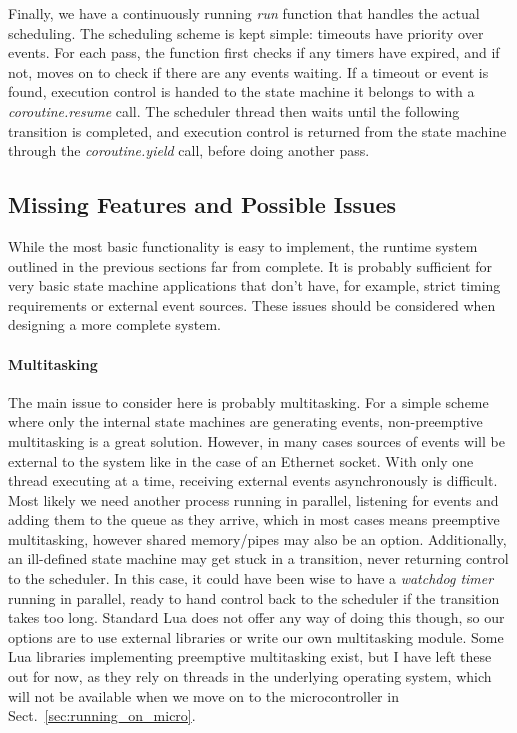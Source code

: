 Finally, we have a continuously running \emph{run} function that handles the actual scheduling. The scheduling scheme is kept simple: timeouts have priority over events. For each pass, the function first checks if any timers have expired, and if not, moves on to check if there are any events waiting. If a timeout or event is found, execution control is handed to the state machine it belongs to with a \emph{coroutine.resume} call. The scheduler thread then waits until the following transition is completed, and execution control is returned from the state machine through the \emph{coroutine.yield} call, before doing another pass.

\subsection{Missing Features and Possible Issues}
While the most basic functionality is easy to implement, the runtime system outlined in the previous sections far from complete. It is probably sufficient for very basic state machine applications that don't have, for example, strict timing requirements or external event sources. These issues should be considered when designing a more complete system.

\paragraph{Multitasking} The main issue to consider here is probably multitasking. For a simple scheme where only the internal state machines are generating events, non-preemptive multitasking is a great solution. However, in many cases sources of events will be external to the system like in the case of an Ethernet socket. With only one thread executing at a time, receiving external events asynchronously is difficult. Most likely we need another process running in parallel, listening for events and adding them to the queue as they arrive, which in most cases means preemptive multitasking, however shared memory/pipes may also be an option. Additionally, an ill-defined state machine may get stuck in a transition, never returning control to the scheduler. In this case, it could have been wise to have a \emph{watchdog timer} running in parallel, ready to hand control back to the scheduler if the transition takes too long. Standard Lua does not offer any way of doing this though, so our options are to use external libraries or write our own multitasking module. Some Lua libraries implementing preemptive multitasking exist, but I have left these out for now, as they rely on threads in the underlying operating system, which will not be available when we move on to the microcontroller in Sect.~\ref{sec:running_on_micro}.

